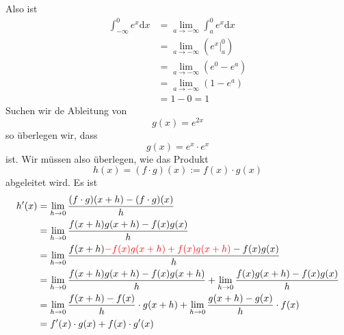 \documentclass{report}
\begin{document}
Also ist
\begin{align*}
\int_{-\infty}^{0} e^x \mathrm{d}x &= \lim_{a \to -\infty}{ \int_{a}^{0} e^x \mathrm{d}x}\\
&= \lim_{a \to -\infty}{\left( \left. e^x \right|_{a}^{0} \right)}\\
&= \lim_{a \to -\infty}{\left( e^0 - e^a \right)}\\
&= \lim_{a \to -\infty}{\left( 1 - e^a \right)}\\
&= 1 - 0 =1
\end{align*}
Suchen wir de Ableitung von
\begin{equation}
g(x) = e^{2x}
\end{equation}
so überlegen wir, dass
\begin{equation}
g(x) = e^x \cdot e^x
\end{equation}
ist. Wir müssen also überlegen, wie das Produkt
\begin{equation}
h(x) = (f \cdot g)(x) := f(x) \cdot g(x)
\end{equation}
abgeleitet wird. Es ist
\begin{align*}
h\rq{}(x) &= \lim_{h \to 0}{\frac{(f \cdot g)(x+h) - (f \cdot g)(x)}{h}}\\
&=\lim_{h \to 0}{\frac{f(x+h)g(x+h) - f(x)g(x)}{h}}\\
&= \lim_{h \to 0}{\frac{f(x+h) \textcolor{red}{ - f(x)g(x+h)+f(x)g(x+h)} - f(x)g(x)}{h}}\\
&= \lim_{h \to 0}{\frac{f(x+h)g(x+h) - f(x)g(x+h)}{h}} + \lim_{h \to 0}{\frac{f(x)g(x+h) - f(x)g(x)}{h}}\\
&= \lim_{h \to 0}{\frac{f(x+h) - f(x)}{h}} \cdot g(x+h) + \lim_{h \to 0}{\frac{g(x+h) - g(x)}{h}} \cdot f(x)\\
&= f\rq{}(x) \cdot g(x) + f(x) \cdot g\rq{}(x)
\end{align*}
\end{document}
